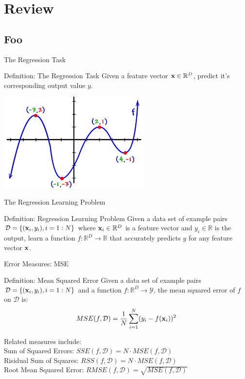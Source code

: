 \documentclass[serif,xcolor=pdftex,dvipsnames,table,hyperref={bookmarks=false,breaklinks}]{beamer}
\begin{document}
\maketitlepage

\section{Review}
\subsection{Foo}

\begin{frame}[t]{The Regression Task}

\begin{block}{Definition: The Regression Task}
Given a feature vector ${\mathbf{x}}\in\mathbb{R}^D$, predict it's corresponding output value $y$.
\end{block}

\center
\includegraphics[width=3in]{../Figures/polynomial-function.png}
\end{frame}

\begin{frame}[t]{The Regression Learning Problem}
\begin{block}{Definition: Regression Learning Problem}
Given a data set of example pairs $\mathcal{D}=\{({\mathbf{x}}_i,y_i),i=1:N\}$ where ${\mathbf{x}}_i\in\mathbb{R}^D$ is a feature vector and $y_i\in \mathbb{R}$ is the output, learn a function $f:\mathbb{R}^D\rightarrow \mathbb{R}$ that accurately predicts $y$ for any feature vector ${\mathbf{x}}$.
\end{block}
\end{frame}

\begin{frame}[t]{Error Measures: MSE}
\begin{block}{Definition: Mean Squared Error}
Given a data set of example pairs $\mathcal{D}=\{({\mathbf{x}}_i,y_i),i=1:N\}$ and a function $f:\mathbb{R}^D\rightarrow \mathcal{Y}$, the mean squared error of $f$ on $\mathcal{D}$ is:
$$MSE(f,\mathcal{D}) = \frac{1}{N}\sum_{i=1}^N(y_i - f({\mathbf{x}}_i))^2$$
\end{block}
\pause

Related measures include: \\
Sum of Squared Errors: $SSE(f,\mathcal{D})=N\cdot MSE(f,\mathcal{D})$\\
Risidual Sum of Squares: $RSS(f,\mathcal{D})=N\cdot MSE(f,\mathcal{D})$\\
Root Mean Squared Error: $RMSE(f,\mathcal{D})=\sqrt{MSE(f,\mathcal{D})}$


\end{frame}
\end{document}
